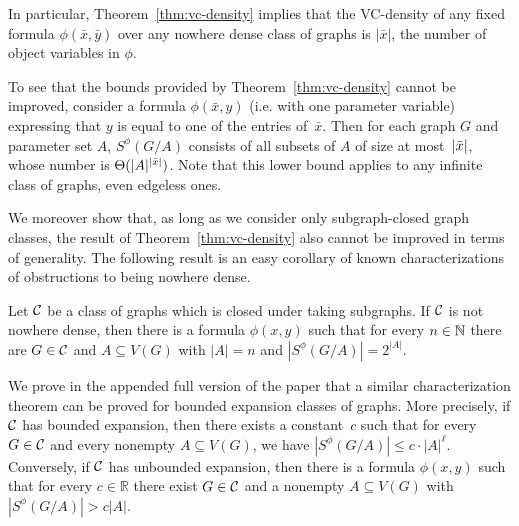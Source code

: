 In particular, Theorem~\ref{thm:vc-density} implies that
the VC-density of any fixed formula 
$\phi(\bar x,\bar y)$ over any nowhere dense class of graphs is $|\bar x|$, the number of object variables in $\phi$.

To see that the bounds provided by Theorem~\ref{thm:vc-density} cannot be improved, consider a formula $\phi(\bar x,y)$ (i.e. with one parameter variable) expressing that $y$ is equal to one of the entries of~$\bar x$. Then for each graph $G$ and parameter set $A$, $S^{\phi}(G/A)$ consists of all subsets of $A$ of size at most~$|\bar{x}|$, whose number is $\Theta(|A|^{|\bar{x}|})$. Note that
this lower bound applies to any infinite class of graphs, even edgeless ones.

We moreover show that, as long as we consider only subgraph-closed graph classes, the result of Theorem~\ref{thm:vc-density} also cannot be improved in terms of generality.
The following result is an easy corollary of known characterizations of obstructions to being nowhere dense.

   \begin{theorem}\label{thm:vc-density-lower-bound}
  Let $\mathcal{C}$ be a class of graphs which 
  is closed under taking subgraphs. 
   If $\mathcal{C}$ is not nowhere dense, then there is a formula 
  $\phi(x,y)$ such that for every $n\in \mathbb{N}$ there are $G\in\mathcal{C}$ and $A\subseteq V(G)$ 
  with $|A|=n$ and $|S^\phi(G/A)|=2^{|A|}$. 
\end{theorem}

We prove in the appended full version of the paper that a similar
characterization theorem can be proved for bounded
expansion classes of graphs. More precisely, if $\mathcal{C}$ has bounded expansion, then there exists a constant~$c$ such that for every $G\in \mathcal{C}$ and every nonempty $A\subseteq V(G)$, we have $|S^\phi(G/A)|\leq c\cdot |A|^\ell$. Conversely, if $\mathcal{C}$ has unbounded 
expansion, then there is a formula 
  $\phi(x,y)$ such that for every $c\in \mathbb{R}$ there exist $G\in\mathcal{C}$ and a nonempty $A\subseteq V(G)$ with $|S^\phi(G/A)|>c|A|$. 


